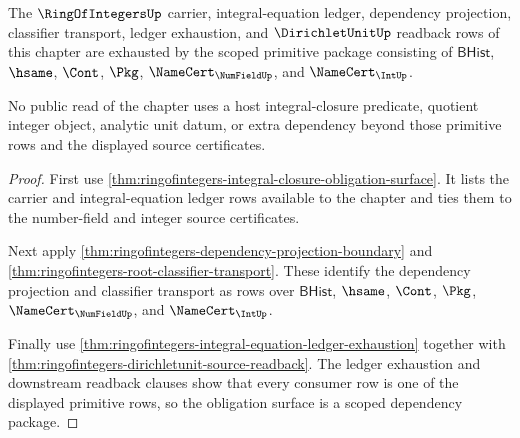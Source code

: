 \begin{theorem}
\label{thm:ringofintegers-scoped-dependency-package}
The $\RingOfIntegersUp$ carrier, integral-equation ledger, dependency
projection, classifier transport, ledger exhaustion, and $\DirichletUnitUp$
readback rows of this chapter are exhausted by the scoped primitive package
consisting of $\mathsf{BHist}$, $\hsame$, $\Cont$, $\Pkg$,
$\NameCert_{\NumFieldUp}$, and $\NameCert_{\IntUp}$.

No public read of the chapter uses a host integral-closure predicate, quotient
integer object, analytic unit datum, or extra dependency beyond those primitive
rows and the displayed source certificates.
\end{theorem}
\begin{proof}
First use
\autoref{thm:ringofintegers-integral-closure-obligation-surface}. It lists the
carrier and integral-equation ledger rows available to the chapter and ties
them to the number-field and integer source certificates.

Next apply \autoref{thm:ringofintegers-dependency-projection-boundary} and
\autoref{thm:ringofintegers-root-classifier-transport}. These identify the
dependency projection and classifier transport as rows over $\mathsf{BHist}$,
$\hsame$, $\Cont$, $\Pkg$, $\NameCert_{\NumFieldUp}$, and
$\NameCert_{\IntUp}$.

Finally use
\autoref{thm:ringofintegers-integral-equation-ledger-exhaustion} together with
\autoref{thm:ringofintegers-dirichletunit-source-readback}. The ledger
exhaustion and downstream readback clauses show that every consumer row is one
of the displayed primitive rows, so the obligation surface is a scoped
dependency package.
\end{proof}

